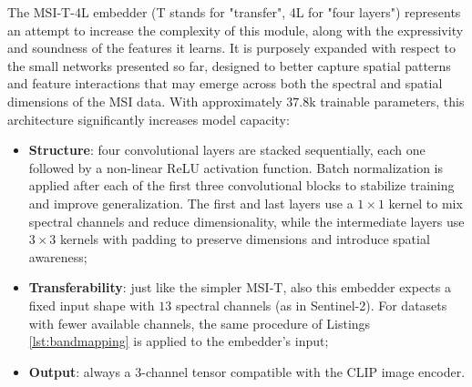\documentclass[a4paper, twoside, english]{sapthesis} %
\begin{document}
The MSI-T-4L embedder (T stands for "transfer", 4L for "four layers") represents an attempt to increase the complexity of this module, along with the expressivity and soundness of the features it learns. It is purposely expanded with respect to the small networks presented so far, designed to better capture spatial patterns and feature interactions that may emerge across both the spectral and spatial dimensions of the MSI data. With approximately $37.8$k trainable parameters, this architecture significantly increases model capacity:

\begin{itemize}
    \item \textbf{Structure}: four convolutional layers are stacked sequentially, each one followed by a non-linear ReLU activation function. Batch normalization is applied after each of the first three convolutional blocks to stabilize training and improve generalization. The first and last layers use a $1\times1$ kernel to mix spectral channels and reduce dimensionality, while the intermediate layers use $3\times3$ kernels with padding to preserve dimensions and introduce spatial awareness;
    \item \textbf{Transferability}: just like the simpler MSI-T, also this embedder expects a fixed input shape with $13$ spectral channels (as in Sentinel-2). For datasets with fewer available channels, the same procedure of Listings \ref{lst:bandmapping} is applied to the embedder's input;
    \item \textbf{Output}: always a $3$-channel tensor compatible with the CLIP image encoder.
\end{itemize}

\vspace{0.5cm}
\end{document}
